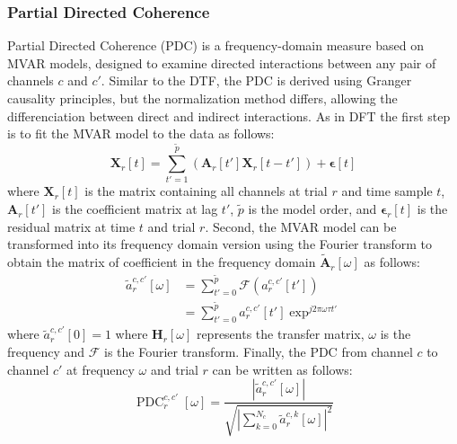 \documentclass[runningheads]{llncs}
\newcommand{\mat}[1]{\bm {#1}}
\newenvironment{reviewer}{\setcounter{pointcounter}{1}}{}
\newcommand{\changes}[1]{\textcolor[rgb]{1.00,0.00,0.00}{#1}}
\begin{document}
\begin{reviewer}
{    \subsubsection{Partial Directed Coherence}
    \changes{
      Partial Directed Coherence (PDC) is a frequency-domain measure
      based on MVAR models, designed to examine directed interactions
      between any pair of channels $c$ and $c'$. Similar to the DTF,
      the PDC is derived using Granger causality principles, but the
      normalization method differs, allowing the differenciation
      between direct and indirect interactions. As in DFT the first
      step is to fit the MVAR model to the data as follows:
      \begin{equation}
        \mat{X}_{r}[t] = \sum_{t'=1}^{\tilde{p}} \left(
        \mat{A}_{r}[t'] \mat{X}_{r}[t-t'] \right) + \mat{\epsilon}[t]
      \end{equation}
      where $\mat{X}_{r}[t]$ is the matrix containing all channels at
      trial $r$ and time sample $t$, $\mat{A}_{r}[t']$ is the
      coefficient matrix at lag $t'$, $\tilde{p}$ is the model order,
      and $\mat{\epsilon}_{r}[t]$ is the residual matrix at time $t$
      and trial $r$. Second, the MVAR model can be transformed into
      its frequency domain version using the Fourier transform to
      obtain the matrix of coefficient in the frequency  domain
      $\tilde{\mat{A}}_{r}[\omega]$ as follows:
      \begin{equation}
        \begin{aligned}
          \tilde{a}^{c,c'}_{r}[\omega] &= \sum_{t'=0}^{\tilde{p}}
          \mathscr{F}\left( {a}^{c,c'}_{r}[t'] \right) \\
          &= \sum_{t'=0}^{\tilde{p}} {a}^{c,c'}_{r}[t'] \exp^{j2\pi
          \omega \tau t'}
        \end{aligned}
      \end{equation}
      where $\tilde{a}^{c,c'}_{r}[0] = 1$
      where $\mat{H}_{r}[\omega]$ represents the transfer matrix,
      $\omega$ is the frequency and $\mathscr{F}$ is the Fourier
      transform. Finally, the PDC from channel $c$ to channel $c'$ at
      frequency $\omega$ and trial $r$ can be written as follows:
      \begin{equation}
        \operatorname{PDC}^{c,c'}_{r}[\omega] =
        \frac{\left|\tilde{a}^{c,c'}_{r}[\omega]\right|}{\sqrt{\left|\sum_{k=0}^{N_c}\tilde{a}^{c,k}_{r}[\omega]\right|^{2}}}
      \end{equation}
    }

}
\end{reviewer}
\end{document}

